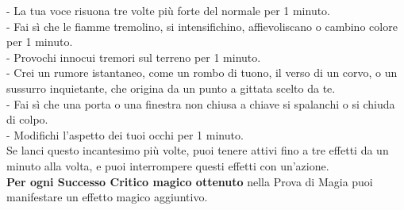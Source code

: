 \begin{multicols}{2}
- La tua voce risuona tre volte più forte del normale per 1 minuto.\\
- Fai sì che le fiamme tremolino, si intensifichino, affievoliscano o cambino colore per 1 minuto.\\
- Provochi innocui tremori sul terreno per 1 minuto.\\
- Crei un rumore istantaneo, come un rombo di tuono, il verso di un corvo, o un sussurro inquietante, che origina da un punto a gittata scelto da te.\\
- Fai sì che una porta o una finestra non chiusa a chiave si spalanchi o si chiuda di colpo.\\
- Modifichi l'aspetto dei tuoi occhi per 1 minuto.\\

Se lanci questo incantesimo più volte, puoi tenere attivi fino a tre effetti da un minuto alla volta, e puoi interrompere questi effetti con un'azione.\\
\textbf{Per ogni Successo Critico magico ottenuto} nella Prova di Magia puoi manifestare un effetto magico aggiuntivo.


\end{multicols}
